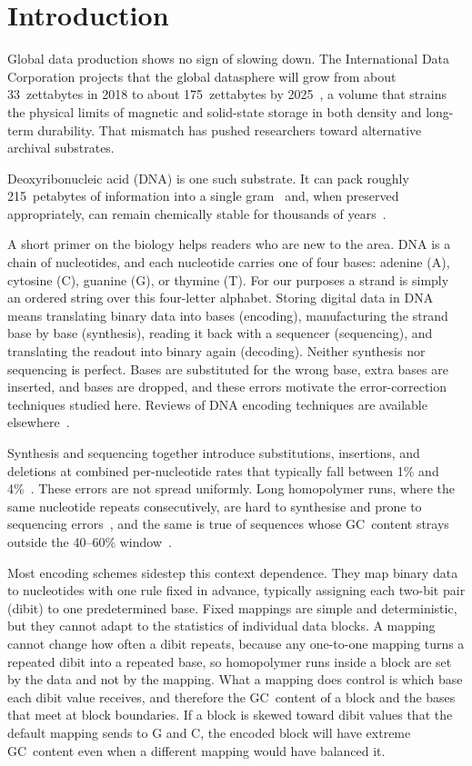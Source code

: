 \documentclass[entropy,article,submit,moreauthors]{Definitions/mdpi}
\begin{document}
\section{Introduction}
\label{sec:introduction}

Global data production shows no sign of slowing down. The International Data Corporation projects that the global datasphere will grow from about 33~zettabytes in 2018 to about 175~zettabytes by 2025~\cite{reinsel2018}, a volume that strains the physical limits of magnetic and solid-state storage in both density and long-term durability. That mismatch has pushed researchers toward alternative archival substrates.

Deoxyribonucleic acid (DNA) is one such substrate. It can pack roughly 215~petabytes of information into a single gram~\cite{erlich2017} and, when preserved appropriately, can remain chemically stable for thousands of years~\cite{grass2015}.

A short primer on the biology helps readers who are new to the area. DNA is a chain of nucleotides, and each nucleotide carries one of four bases: adenine (A), cytosine (C), guanine (G), or thymine (T). For our purposes a strand is simply an ordered string over this four-letter alphabet. Storing digital data in DNA means translating binary data into bases (encoding), manufacturing the strand base by base (synthesis), reading it back with a sequencer (sequencing), and translating the readout into binary again (decoding). Neither synthesis nor sequencing is perfect. Bases are substituted for the wrong base, extra bases are inserted, and bases are dropped, and these errors motivate the error-correction techniques studied here. Reviews of DNA encoding techniques are available elsewhere~\cite{chandra2025encoding}.

Synthesis and sequencing together introduce substitutions, insertions, and deletions at combined per-nucleotide rates that typically fall between 1\% and 4\%~\cite{ross2013, heckel2019}. These errors are not spread uniformly. Long homopolymer runs, where the same nucleotide repeats consecutively, are hard to synthesise and prone to sequencing errors~\cite{erlich2017}, and the same is true of sequences whose GC~content strays outside the 40--60\% window~\cite{ross2013}.

Most encoding schemes sidestep this context dependence. They map binary data to nucleotides with one rule fixed in advance, typically assigning each two-bit pair (dibit) to one predetermined base. Fixed mappings are simple and deterministic, but they cannot adapt to the statistics of individual data blocks. A mapping cannot change how often a dibit repeats, because any one-to-one mapping turns a repeated dibit into a repeated base, so homopolymer runs inside a block are set by the data and not by the mapping. What a mapping does control is which base each dibit value receives, and therefore the GC~content of a block and the bases that meet at block boundaries. If a block is skewed toward dibit values that the default mapping sends to G and C, the encoded block will have extreme GC~content even when a different mapping would have balanced it.
\end{document}
